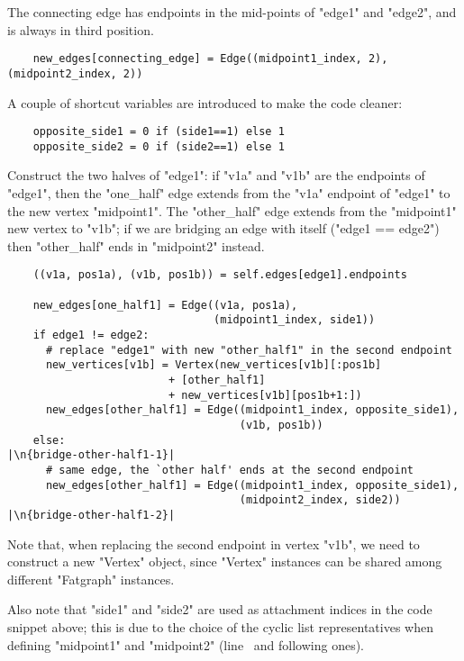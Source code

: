 The connecting edge has endpoints in the mid-points of
"edge1" and "edge2", and is always in third position.
\begin{lstlisting}
    new_edges[connecting_edge] = Edge((midpoint1_index, 2), (midpoint2_index, 2))

\end{lstlisting}
A couple of shortcut variables are introduced to make the code cleaner:
\begin{lstlisting}
    opposite_side1 = 0 if (side1==1) else 1
    opposite_side2 = 0 if (side2==1) else 1

\end{lstlisting}

Construct the two halves of "edge1": if "v1a" and "v1b" are the
endpoints of "edge1", then the "one_half" edge extends from the "v1a"
endpoint of "edge1" to the new vertex "midpoint1".  The "other_half"
edge extends from the "midpoint1" new vertex to "v1b"; if we are
bridging an edge with itself ("edge1 == edge2") then "other_half"
ends in "midpoint2" instead.
\begin{lstlisting}
    ((v1a, pos1a), (v1b, pos1b)) = self.edges[edge1].endpoints

    new_edges[one_half1] = Edge((v1a, pos1a), 
                                (midpoint1_index, side1))
    if edge1 != edge2:
      # replace "edge1" with new "other_half1" in the second endpoint
      new_vertices[v1b] = Vertex(new_vertices[v1b][:pos1b]
                         + [other_half1]
                         + new_vertices[v1b][pos1b+1:])
      new_edges[other_half1] = Edge((midpoint1_index, opposite_side1), 
                                    (v1b, pos1b))
    else:                                                        |\n{bridge-other-half1-1}|
      # same edge, the `other half' ends at the second endpoint
      new_edges[other_half1] = Edge((midpoint1_index, opposite_side1), 
                                    (midpoint2_index, side2))    |\n{bridge-other-half1-2}|

\end{lstlisting}
Note that, when replacing the second endpoint in vertex "v1b", we need
to construct a new "Vertex" object, since "Vertex" instances can be
shared among different "Fatgraph" instances.

Also note that "side1" and "side2" are used as attachment indices in
the code snippet above; this is due to the choice of the cyclic list
representatives when defining "midpoint1" and "midpoint2"
(line~ and following ones).

